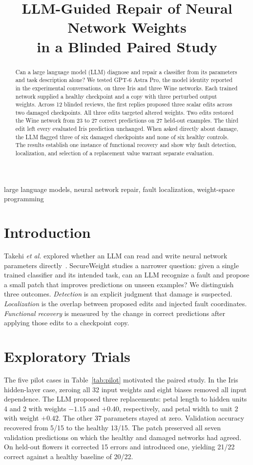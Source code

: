 \documentclass[conference,letterpaper]{IEEEtran}
\title{LLM-Guided Repair of Neural Network Weights\\in a Blinded Paired Study}
\author{\IEEEauthorblockN{SecureWeight}\IEEEauthorblockA{Research note, 19 November 2026}}
\begin{document}
\maketitle
\begin{abstract}
Can a large language model (LLM) diagnose and repair a classifier from its parameters and task description alone? We tested GPT-6 Astra Pro, the model identity reported in the experimental conversations, on three Iris and three Wine networks. Each trained network supplied a healthy checkpoint and a copy with three perturbed output weights. Across 12 blinded reviews, the first replies proposed three scalar edits across two damaged checkpoints. All three edits targeted altered weights. Two edits restored the Wine network from 23 to 27 correct predictions on 27 held-out examples. The third edit left every evaluated Iris prediction unchanged. When asked directly about damage, the LLM flagged three of six damaged checkpoints and none of six healthy controls. The results establish one instance of functional recovery and show why fault detection, localization, and selection of a replacement value warrant separate evaluation.
\end{abstract}
\begin{IEEEkeywords}
large language models, neural network repair, fault localization, weight-space programming
\end{IEEEkeywords}

\section{Introduction}
Takehi \emph{et al.} explored whether an LLM can read and write neural network parameters directly~\cite{wsp}. SecureWeight studies a narrower question: given a single trained classifier and its intended task, can an LLM recognize a fault and propose a small patch that improves predictions on unseen examples? We distinguish three outcomes. \emph{Detection} is an explicit judgment that damage is suspected. \emph{Localization} is the overlap between proposed edits and injected fault coordinates. \emph{Functional recovery} is measured by the change in correct predictions after applying those edits to a checkpoint copy.

\section{Exploratory Trials}
The five pilot cases in Table~\ref{tab:pilot} motivated the paired study. In the Iris hidden-layer case, zeroing all 32 input weights and eight biases removed all input dependence. The LLM proposed three replacements: petal length to hidden units 4 and 2 with weights $-1.15$ and $+0.40$, respectively, and petal width to unit 2 with weight $+0.42$. The other 37 parameters stayed at zero. Validation accuracy recovered from 5/15 to the healthy 13/15. The patch preserved all seven validation predictions on which the healthy and damaged networks had agreed. On held-out flowers it corrected 15 errors and introduced one, yielding 21/22 correct against a healthy baseline of 20/22.
\end{document}
